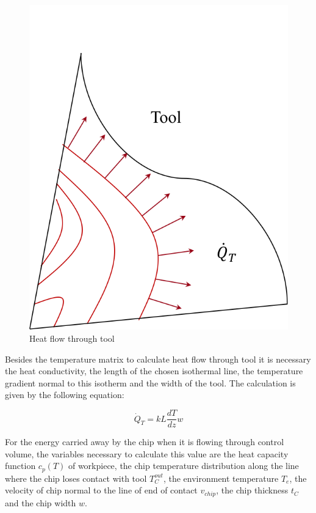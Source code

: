 	\begin{figure}[H]
		\centering
		\captionsetup{justification=centering}
		\includegraphics[scale=0.6]{Cap4/ToolHeat.png}
		\caption{Heat flow through tool}
		\label{fig:heattool}
	\end{figure}

	Besides the temperature matrix to calculate heat flow through tool it is necessary the heat conductivity, the length of the chosen isothermal line, the temperature gradient normal to this isotherm and the width of the tool. The calculation is given by the following equation:

	\begin{equation} 
	\label{eq_heattool}
		\dot{Q}_{T} = kL\frac{dT}{dz}w
	\end{equation}

	For the energy carried away by the chip when it is flowing through control volume, the variables necessary to calculate this value are the heat capacity function $c_{p}(T)$ of workpiece, the chip temperature distribution along the line where the chip loses contact with tool $T_{C}^{out}$, the environment temperature $T_{e}$, the velocity of chip normal to the line of end of contact $v_{chip}$, the chip thickness $t_{C}$ and the chip width $w$.

